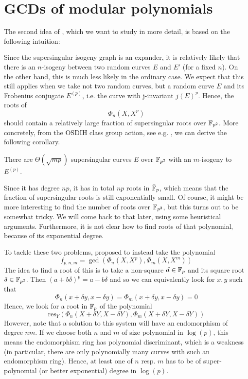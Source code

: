 \section{GCDs of modular polynomials}
The second idea of \cite{base_paper}, which we want to study in more detail, is based on the following intuition:

Since the supersingular isogeny graph is an expander, it is relatively likely that there is an $n$-isogeny between two random curves $E$ and $E'$ (for a fixed $n$).
On the other hand, this is much less likely in the ordinary case.
We expect that this still applies when we take not two random curves, but a random curve $E$ and its Frobenius conjugate $E^{(p)}$, i.e. the curve with j-invariant $j(E)^p$.
Hence, the roots of
\begin{equation*}
    \Phi_n(X, X^p)
\end{equation*}
should contain a relatively large fraction of supersingular roots over $\mathbb{F}_{p^2}$.
More concretely, from the OSDIH class group action, see e.g. \cite[Thm~4.3]{chenu_smith}, we can derive the following corollary.
\begin{corollary}
    \label{prop:osidh_class_group_action}
    There are $\Theta(\sqrt{mp})$ supersingular curves $E$ over $\mathbb{F}_{p^2}$ with an $m$-isogeny to $E^{(p)}$.
\end{corollary}
Since it has degree $np$, it has in total $np$ roots in $\bar{\mathbb{F}}_p$, which means that the fraction of supersingular roots is still exponentially small.
Of course, it might be more interesting to find the number of roots over $\mathbb{F}_{p^2}$, but this turns out to be somewhat tricky.
We will come back to that later, using some heuristical arguments.
Furthermore, it is not clear how to find roots of that polynomial, because of its exponential degree.

To tackle these two problems, \cite{base_paper} proposed to instead take the polynomial
\begin{equation*}
    f_{p, n, m} = \gcd(\Phi_n(X, X^p), \Phi_m(X, X^m))
\end{equation*}
The idea to find a root of this is to take a non-square $d \in \mathbb{F}_p$ and its square root $\delta \in \mathbb{F}_{p^2}$.
Then $(a + b\delta)^p = a - b\delta$ and so we can equivalently look for $x, y$ such that
\begin{equation*}
    \Phi_n(x + \delta y, x - \delta y) = \Phi_m(x + \delta y, x - \delta y) = 0
\end{equation*}
Hence, we look for a root in $\mathbb{F}_p$ of the polynomial
\begin{equation*}
    \mathrm{res}_Y(\Phi_n(X + \delta Y, X - \delta Y), \Phi_m(X + \delta Y, X - \delta Y))
\end{equation*}
However, note that a solution to this system will have an endomorphism of degree $nm$.
If we choose both $n$ and $m$ of size polynomial in $\log(p)$, this means the endomorphism ring has polynomial discriminant, which is a weakness (in particular, there are only polynomially many curves with such an endomorphism ring).
Hence, at least one of $n$ resp. $m$ has to be of super-polynomial (or better exponential) degree in $\log(p)$.

